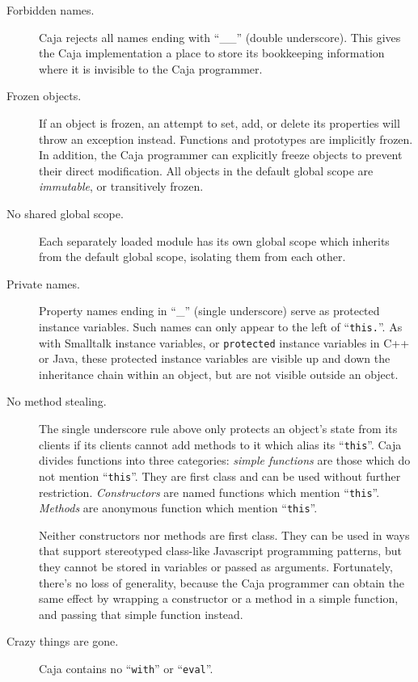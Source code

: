 \documentclass[letterpaper,twocolumn,10pt]{article}
\newcommand{\code}[1]{{\tt {#1}}}              %
\begin{document}
\begin{description}

  \item[Forbidden names.] Caja rejects all names ending with ``\_\_'' (double 
  underscore). This gives the Caja implementation a place to store its 
  bookkeeping information where it is invisible to the Caja programmer.
  
  \item[Frozen objects.] If an object is frozen, an attempt to set, add, or 
  delete its properties will throw an exception instead. Functions and 
  prototypes are implicitly frozen. In addition, the Caja programmer can 
  explicitly freeze objects to prevent their direct modification. All objects 
  in the default global scope are \emph{immutable}, or transitively frozen.
  
  \item[No shared global scope.] Each separately loaded module has its own
  global scope which inherits from the default global scope, isolating them
  from each other.

  \item[Private names.] Property names ending in ``\_'' (single underscore) 
  serve as protected instance variables. Such names can only appear to the 
  left of ``\code{this.}''. As with Smalltalk instance variables, or 
  \code{protected} instance variables in C++ or Java, these protected 
  instance variables are visible up and down the inheritance chain within an 
  object, but are not visible outside an object.
  
  \item[No method stealing.] The single underscore rule above only protects 
  an object's state from its clients if its clients cannot add methods to it 
  which alias its ``\code{this}''. Caja divides functions into three 
  categories: \emph{simple functions} are those which do not mention 
  ``\code{this}''. They are first class and can be used without further 
  restriction. \emph{Constructors} are named functions which mention 
  ``\code{this}''. \emph{Methods} are anonymous function which mention 
  ``\code{this}''.

  Neither constructors nor methods are first class. They can be used in ways 
  that support stereotyped class-like Javascript programming patterns, but 
  they cannot be stored in variables or passed as arguments. Fortunately, 
  there's no loss of generality, because the Caja programmer can obtain the 
  same effect by wrapping a constructor or a method in a simple function, and 
  passing that simple function instead.
  
  \item[Crazy things are gone.] Caja contains no ``\code{with}'' or 
  ``\code{eval}''.
  
\end{description}
\end{document}
